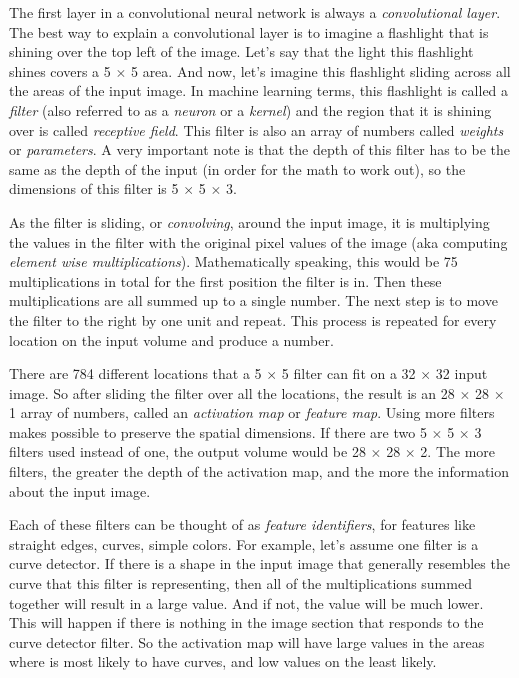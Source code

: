 \documentclass[12pt,a4paper]{report}
\newcommand{\term}{\textit}
\begin{document}
	The first layer in a convolutional neural network is always a \term{convolutional 
	layer}. The best way to explain a convolutional layer is to imagine a flashlight 
	that is shining over the top left of the image. Let’s say that the light this 
	flashlight shines covers a 5 $\times$ 5 area. And now, let’s imagine this flashlight 
	sliding across all the areas of the input image. In machine learning terms, this 
	flashlight is called a \term{filter} (also referred to as a \term{neuron} or a 
	\term{kernel}) and the region that it is shining over is called \term{receptive 
	field}. This filter is also an array of numbers called \term{weights} or 
	\term{parameters}. A very important note is that the depth of this filter has to 
	be the same as the depth of the input (in order for the math to work out), so the 
	dimensions of this filter is 5 $\times$ 5 $\times$ 3. 
	\par
	As the filter is sliding, or \term{convolving}, around the input image, it is 
	multiplying the values in the filter with the original pixel values of the image 
	(aka computing \term{element wise multiplications}). Mathematically speaking, this 
	would be 75 multiplications in total for the first position the filter is in. Then 
	these multiplications are all summed up to a single number. The next step is to 
	move the filter to the right by one unit and repeat. This process is repeated for 
	every location on the input volume and produce a number.
	\par
	There are 784 different locations that a 5 $\times$ 5 filter can fit on a 
	32 $\times$ 32 input image. So after sliding the filter over all the locations, 
	the result is an 28 $\times$ 28 $\times$ 1 array of numbers, called an \term{activation 
	map} or \term{feature map}. Using more filters makes possible to preserve the spatial 
	dimensions. If there are two 5 $\times$ 5 $\times$ 3 filters used instead of one, 
	the output volume would be 28 $\times$ 28 $\times$ 2. The more filters, the greater 
	the depth of the activation map, and the more the information about the input image.
	\par
	Each of these filters can be thought of as \term{feature identifiers}, for features 
	like straight edges, curves, simple colors. For example, let's assume one filter 
	is a curve detector. If there is a shape in the input image that generally resembles 
	the curve that this filter is representing, then all of the multiplications summed 
	together will result in a large value. And if not, the value will be much lower. 
	This will happen if there is nothing in the image section that responds to the 
	curve detector filter. So the activation map will have large values in the areas 
	where is most likely to have curves, and low values on the least likely.
	\\
	
\end{document}
